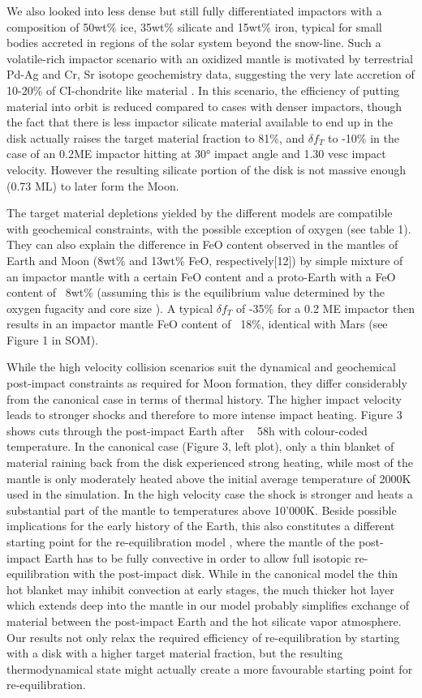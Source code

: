 We also looked into less dense but still fully differentiated impactors with a composition of 50wt\% ice, 35wt\% silicate and 15wt\% iron, typical for small bodies accreted in regions of the solar system beyond the snow-line. Such a volatile-rich impactor scenario with an oxidized mantle is motivated  by terrestrial Pd-Ag and Cr, Sr isotope geochemistry data, suggesting the very late accretion of 10-20\% of CI-chondrite like material \citep{2010Sci...328..884S}. In this scenario, the efficiency of putting material into orbit is reduced compared to cases with denser impactors, though the fact that there is less impactor silicate material available to end up in the disk actually raises the target material fraction to 81\%, and $\delta f_{T}$ to -10\% in the case of an 0.2ME impactor hitting at 30° impact angle and 1.30 vesc impact velocity. However the resulting silicate portion of the disk is not massive enough (0.73 ML) to later form the Moon.  

The target material depletions yielded by the different models are compatible with geochemical constraints, with the possible exception of oxygen (see table 1). They can also explain the difference in FeO content observed in the mantles of Earth and Moon (8wt\% and 13wt\% FeO, respectively[12]) by simple mixture of an impactor mantle with a certain FeO content and a proto-Earth with a FeO content of ~8wt\% (assuming this is the equilibrium value determined by the oxygen fugacity and core size \citep{2006mess.book..803R}). A typical $\delta f_{T}$ of -35\% for a 0.2 ME impactor then results in an impactor mantle FeO content of ~18\%, identical with Mars (see Figure 1 in SOM).

While the high velocity collision scenarios suit the dynamical and geochemical post-impact constraints as required for Moon formation, they differ considerably from the canonical case in terms of thermal history. The higher impact velocity leads to stronger shocks and therefore to more intense impact heating. Figure 3 shows cuts through the post-impact Earth after ~ 58h with colour-coded temperature. In the canonical case (Figure 3, left plot), only a thin blanket of material raining back from the disk experienced strong heating, while most of the mantle is only moderately heated above the initial average temperature of 2000K used in the simulation. In the high velocity case the shock is stronger and heats a substantial part of the mantle to temperatures above 10'000K. Beside possible implications for the early history of the Earth, this also constitutes a different starting point for the re-equilibration model \citep{Pahlevan:2007p2065}, where the mantle of the post-impact Earth has to be fully convective in order to allow full isotopic re-equilibration with the post-impact disk. While in the canonical model the thin hot blanket may inhibit convection at early stages, the much thicker hot layer which extends deep into the mantle in our model probably simplifies exchange of material between the post-impact Earth and the hot silicate vapor atmosphere. Our results not only relax the required efficiency of re-equilibration by starting with a disk with a higher target material fraction, but the resulting thermodynamical state might actually create a more favourable starting point for re-equilibration.

